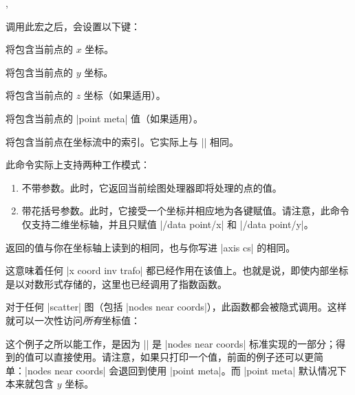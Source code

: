 \begin{commandlist}{\pgfplotspointgetcoordinates,\pgfplotspointgetcoordinates{}}

    调用此宏之后，会设置以下键：

     将包含当前点的 $x$ 坐标。

     将包含当前点的 $y$ 坐标。

     将包含当前点的 $z$ 坐标（如果适用）。

     将包含当前点的
    |point meta| 值（如果适用）。

     将包含当前点在坐标流中的索引。它实际上与 |\coordindex| 相同。

    此命令实际上支持两种工作模式：
    \begin{enumerate}
        \item 不带参数。此时，它返回当前绘图处理器即将处理的点的值。
        \item 带花括号参数。此时，它接受一个坐标并相应地为各键赋值。请注意，此命令仅支持二维坐标轴，并且只赋值
            |/data point/x| 和 |/data point/y|。
    \end{enumerate}

    返回的值与你在坐标轴上读到的相同，也与你写进 |axis cs| 的相同。

    这意味着任何 |x coord inv trafo| 都已经作用在该值上。也就是说，即使内部坐标是以对数形式存储的，这里也已经调用了指数函数。

    对于任何 |scatter| 图（包括 |nodes near coords|），此函数都会被隐式调用。这样就可以一次性访问\emph{所有}坐标值：
\begin{codeexample}[]
\end{codeexample}
    这个例子之所以能工作，是因为 |\pgfplotspointgetcoordinates| 是 |nodes near coords| 标准实现的一部分；得到的值可以直接使用。请注意，如果只打印一个值，前面的例子还可以更简单：|nodes near coords| 会退回到使用 |point meta|。而 |point meta| 默认情况下本来就包含 $y$ 坐标。


\end{commandlist}
